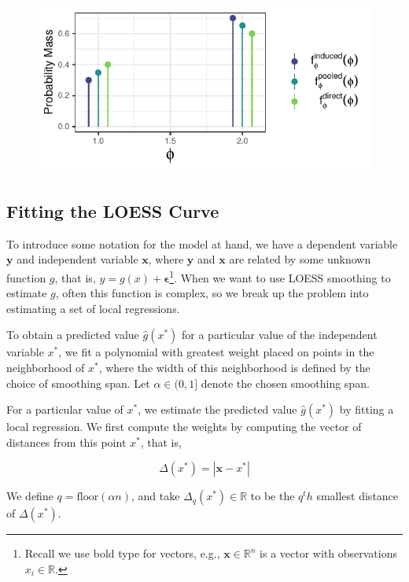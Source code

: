 \documentclass[12pt,twoside]{smiththesis}
\begin{document}
\begin{figure}
\centering
\includegraphics{thesis_files/figure-latex/unnamed-chunk-15-1.pdf}
\caption{\label{fig:unnamed-chunk-15}\label{fig:smooth-spans}}
\end{figure}
\hypertarget{fitting-the-loess-curve}{%
\subsection{Fitting the LOESS Curve}\label{fitting-the-loess-curve}}

To introduce some notation for the model at hand, we have a dependent variable \(\mathbf y\) and independent variable \(\mathbf x\), where \(\mathbf y\) and \(\mathbf x\) are related by some unknown function \(g\), that is, \(y = g(x) + \boldsymbol \epsilon\)\footnote{Recall we use bold type for vectors, e.g., \(\mathbf x \in \mathbb R^n\) is a vector with observations \(x_i \in \mathbb R\).}. When we want to use LOESS smoothing to estimate \(g\), often this function is complex, so we break up the problem into estimating a set of local regressions.

To obtain a predicted value \(\hat g(x^*)\) for a particular value of the independent variable \(x^*\), we fit a polynomial with greatest weight placed on points in the neighborhood of \(x^*\), where the width of this neighborhood is defined by the choice of smoothing span. Let \(\alpha \in (0,1]\) denote the chosen smoothing span.

For a particular value of \(x^*\), we estimate the predicted value \(\hat g(x^*)\) by fitting a local regression. We first compute the weights by computing the vector of distances from this point \(x^*\), that is,

\[\Delta (x^*) = |\mathbf x -x^* | \]

We define \(q = \text{floor}(\alpha n)\), and take \(\Delta_q(x^*) \in \mathbb R\) to be the \(q^th\) smallest distance of \(\Delta (x^*)\).
\end{document}
